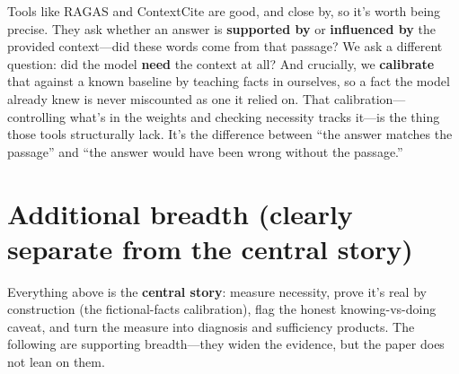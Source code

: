 \documentclass[11pt]{article}
\begin{document}
Tools like RAGAS and ContextCite are good, and close by, so it's worth being precise. They ask
whether an answer is \textbf{supported by} or \textbf{influenced by} the provided context---did
these words come from that passage? We ask a different question: did the model \textbf{need} the
context at all? And crucially, we \textbf{calibrate} that against a known baseline by teaching
facts in ourselves, so a fact the model already knew is never miscounted as one it relied on.
That calibration---controlling what's in the weights and checking necessity tracks it---is the
thing those tools structurally lack. It's the difference between ``the answer matches the
passage'' and ``the answer would have been wrong without the passage.''

\section*{Additional breadth (clearly separate from the central story)}

Everything above is the \textbf{central story}: measure necessity, prove it's real by construction
(the fictional-facts calibration), flag the honest knowing-vs-doing caveat, and turn the measure
into diagnosis and sufficiency products. The following are supporting breadth---they widen the
evidence, but the paper does not lean on them.
\end{document}
